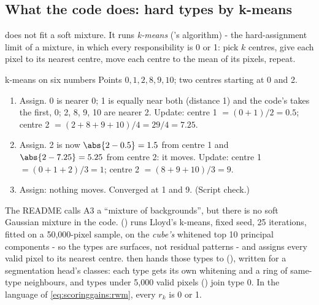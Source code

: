 \subsection{What the code does: hard types by k-means}

 does not fit a soft mixture. It runs \emph{k-means} (\citet{lloyd1982least}'s algorithm) - the
hard-assignment limit of a mixture, in which every responsibility is 0 or 1: pick $k$ centres, give each pixel to its
nearest centre, move each centre to the mean of its pixels, repeat.

\begin{worked}[label={we:scoringgains:kmeans}]{k-means on six numbers}
Points $0, 1, 2, 8, 9, 10$; two centres starting at 0 and 2.
\begin{enumerate}
\item Assign. 0 is nearer 0; 1 is equally near both (distance 1) and the code's  takes the first, 0; 2, 8, 9,
  10 are nearer 2. Update: centre 1 $= (0 + 1)/2 = 0.5$; centre 2 $= (2 + 8 + 9 + 10)/4 = 29/4 = 7.25$.
\item Assign. 2 is now $\abs{2 - 0.5} = 1.5$ from centre 1 and $\abs{2 - 7.25} = 5.25$ from centre 2: it moves. Update:
  centre 1 $= (0 + 1 + 2)/3 = 1$; centre 2 $= (8 + 9 + 10)/3 = 9$.
\item Assign: nothing moves. Converged at 1 and 9. (Script check\tagC.)
\end{enumerate}
\end{worked}

\begin{sourcenote}
The README calls A3 a ``mixture of backgrounds'', but there is no soft Gaussian mixture in the code.
 () runs Lloyd's k-means, fixed seed, 25 iterations, fitted on a
50,000-pixel sample, on the \emph{cube's} whitened top 10 principal components - so the types are surfaces, not residual
patterns - and assigns every valid pixel to its nearest centre.  then hands those types to
 (), written for a
segmentation head's classes: each type gets its own whitening and a ring of same-type neighbours, and types under 5,000
valid pixels () join type 0. In the language of \eqref{eq:scoringgains:rwm}, every $r_k$ is 0 or 1.
\end{sourcenote}


